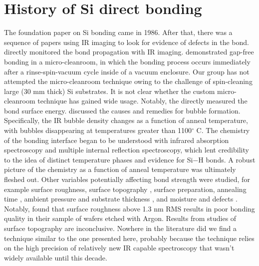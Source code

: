 \documentclass[osajnl,preprint,showpacs,superscriptaddress,12pt]{revtex4-1} %
\begin{document}
\section{History of Si direct bonding}
\label{secHistory}

The foundation paper on Si bonding came in 1986\cite{1986JAP....60.2987S}.  After that, there was a sequence of papers using IR imaging to look for evidence of defects in the bond.  \cite{1988JaJAP..27L2364S, 1995ApPhL..67.3614G} directly monitored the bond propagation with IR imaging.  \cite{1988JaJAP..27L2364S, 1989JaJAP..28L2141L} demonstrated gap-free bonding in a micro-cleanroom, in which the bonding process occurs immediately after a rinse-spin-vacuum cycle inside of a vacuum enclosure.  Our group has not attempted the micro-cleanroom technique owing to the challenge of spin-cleaning large (30 mm thick) Si substrates.  It is not clear whether the custom micro-cleanroom technique has gained wide usage.  Notably, the   \cite{1989JaJAP..28L2141L} directly measured the bond surface energy.  \cite{Mitani1990} discussed the causes and remedies for bubble formation.  Specifically, the IR bubble density changes as a function of anneal temperature\cite{1992JEMat..21..669M}, with bubbles disappearing at temperatures greater than 1100$^\circ$ C.  The chemistry of the bonding interface began to be understood with infrared absorption spectroscopy and multiple internal reflection spectroscopy\cite{feijoo1994}, which lent credibility to the idea of distinct temperature phases and evidence for Si$-$H bonds\cite{1995ApPhA..61..101R}.  A robust picture of the chemistry as a function of anneal temperature was ultimately fleshed out\cite{1996JaJAP..35.2102R, 1998AnRMS..28..215G}.  Other variables potentially affecting bond strength were studied, for example surface roughness\cite{JJAP.37.4197}, surface topography \cite{2001JOptA...3...85G}, surface preparation\cite{1996ApPhL..68.2222T}, annealing time \cite{2000JAP....88.4404H}, ambient pressure and substrate thickness \cite{1995ApPhL..67..863G, 2007ApOpt..46.6793H}, and moisture and defects \cite{2001JAP....89.6013L}.  Notably, \cite{JJAP.37.4197} found that surface roughness above 1.3 nm RMS results in poor bonding quality in their sample of wafers etched with Argon.  Results from studies of surface topography are inconclusive\cite{2001JOptA...3...85G}.  Nowhere in the literature did we find a technique similar to the one presented here, probably because the technique relies on the high precision of relatively new IR capable spectroscopy that wasn't widely available until this decade.
\end{document}
